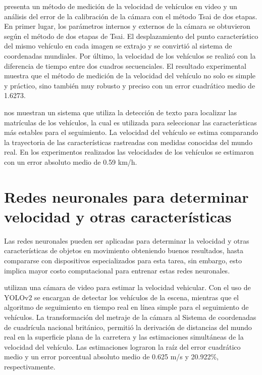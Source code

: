 \citeauthor{yan2010Research} presenta un método de medición de la velocidad de vehículos en video y un análisis del error de la calibración de la cámara con el método Tsai de dos etapas. En primer lugar, los parámetros internos y externos de la cámara se obtuvieron según el método de dos etapas de Tsai. El desplazamiento del punto característico del mismo vehículo en cada imagen se extrajo y se convirtió al sistema de coordenadas mundiales. Por último, la velocidad de los vehículos se realizó con la diferencia de tiempo entre dos cuadros secuenciales. El resultado experimental muestra que el método de medición de la velocidad del vehículo no solo es simple y práctico, sino también muy robusto y preciso con un error cuadrático medio de 1.6273.


\citeauthor{luvizon2014Vehicle} nos muestran un sistema que utiliza la detección de texto para localizar las matrículas de los vehículos, la cual es utilizada para seleccionar las características más estables para el seguimiento. La velocidad del vehículo se estima comparando la trayectoria de las características rastreadas con medidas conocidas del mundo real. En los experimentos realizados las velocidades de los vehículos se estimaron con un error absoluto medio de 0.59 km/h.


\section{Redes neuronales para determinar velocidad y otras características}

Las redes neuronales pueden ser aplicadas para determinar la velocidad y otras características de objetos en movimiento obteniendo buenos resultados, hasta compararse con dispositivos especializados para esta tarea, sin embargo, esto implica mayor costo computacional para entrenar estas redes neuronales.


\citeauthor{bell2020Accurate} utilizan una cámara de video para estimar la velocidad vehicular. Con el uso de YOLOv2 se encargan de detectar los vehículos de la escena, mientras que el algoritmo de seguimiento en tiempo real en línea simple para el seguimiento de vehículos. La transformación del metraje de la cámara al Sistema de coordenadas de cuadrícula nacional británico, permitió la derivación de distancias del mundo real en la superficie plana de la carretera y las estimaciones simultáneas de la velocidad del vehículo. Las estimaciones lograron la raíz del error cuadrático medio y un error porcentual absoluto medio de 0.625 m/s y 20.922\%, respectivamente.


